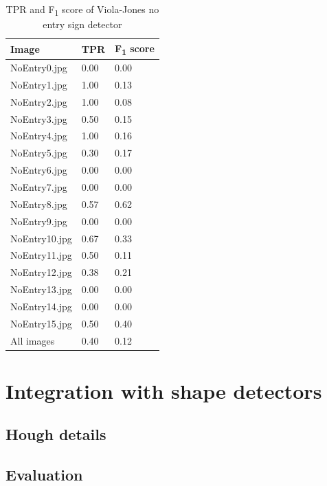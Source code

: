 \documentclass[onecolumn, 11pt, a4paper]{article}
\begin{document}
\begin{table}
  \vspace{-2.5em}
  \begin{center}
  \caption{TPR and F\textsubscript{1} score of Viola-Jones no entry sign detector}\label{tab:vj}
  \begin{tabular}{l | l l} 
    \hline\hline
    Image&TPR&F\textsubscript{1} score\\
    \hline
    NoEntry0.jpg&0.00&0.00\\ 
    NoEntry1.jpg&1.00&0.13\\ 
    NoEntry2.jpg&1.00&0.08\\ 
    NoEntry3.jpg&0.50&0.15\\ 
    NoEntry4.jpg&1.00&0.16\\ 
    NoEntry5.jpg&0.30&0.17\\ 
    NoEntry6.jpg&0.00&0.00\\ 
    NoEntry7.jpg&0.00&0.00\\
    NoEntry8.jpg&0.57&0.62\\ 
    NoEntry9.jpg&0.00&0.00\\ 
    NoEntry10.jpg&0.67&0.33\\ 
    NoEntry11.jpg&0.50&0.11\\ 
    NoEntry12.jpg&0.38&0.21\\ 
    NoEntry13.jpg&0.00&0.00\\ 
    NoEntry14.jpg&0.00&0.00\\ 
    NoEntry15.jpg&0.50&0.40\\ 
    \hdashline
    All images&0.40&0.12\\ 
    \hline
  \end{tabular}
  \end{center}
\end{table} 

\clearpage

\section{Integration with shape detectors}

\subsection{Hough details}

\subsection{Evaluation}
\end{document}
